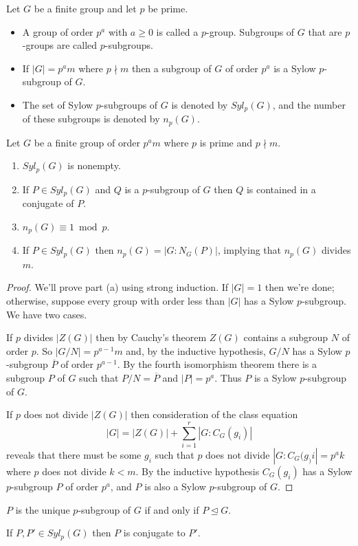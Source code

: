 \documentclass[../m171main.tex]{subfiles}
\begin{document}
\begin{definition}[$p$-group]
    Let $G$ be a finite group and let $p$ be prime.
    \begin{itemize}[topsep=0pt]
        \item A group of order $p^{a}$ with $a \geq 0$ is called a $p$-group.
        Subgroups of $G$ that are $p$-groups are called $p$-subgroups.

        \item If $|G| = p^{a} m$ where $p \nmid m$ then a subgroup of $G$ of order $p^{a}$ is a Sylow $p$-subgroup of $G$.
        
        \item The set of Sylow $p$-subgroups of $G$ is denoted by $Syl_p(G)$, and the number of these subgroups is denoted by $n_p(G)$.
    \end{itemize}
\end{definition}

\begin{theorem}
    Let $G$ be a finite group of order $p^{a}m$ where $p$ is prime and $p \nmid m$.
    \begin{enumerate}[label=(\alph*),topsep=0pt]
        \item $Syl_p(G)$ is nonempty.
        \item If $P \in Syl_p(G)$ and $Q$ is a $p$-subgroup of $G$ then $Q$ is contained in a conjugate of $P$.
        \item $n_p(G) \equiv 1 \bmod p$.
        \item If $P \in Syl_p(G)$ then $n_p(G) = |G : N_G(P)|$, implying that $n_p(G)$ divides $m$.
    \end{enumerate}
\end{theorem}

\begin{proof}
    We'll prove part (a) using strong induction.
    If $|G| = 1$ then we're done; otherwise, suppose every group with order less than $|G|$ has a Sylow $p$-subgroup.
    We have two cases.

    If $p$ divides $|Z(G)|$ then by Cauchy's theorem $Z(G)$ contains a subgroup $N$ of order $p$.
    So $|G / N| = p^{a-1} m$ and, by the inductive hypothesis, $G / N$ has a Sylow $p$-subgroup $\overline P$ of order $p^{a-1}$.
    By the fourth isomorphism theorem there is a subgroup $P$ of $G$ such that $P / N = \overline P$ and $|P| = p^{a}$.
    Thus $P$ is a Sylow $p$-subgroup of $G$.

    If $p$ does not divide $|Z(G)|$ then consideration of the class equation
    \[ |G| = |Z(G)| + \sum_{i=1}^{r} |G : C_G(g_i)| \]
    reveals that there must be some $g_i$ such that $p$ does not divide $|G : C_G(g_)i| = p^{a} k$ where $p$ does not divide $k < m$.
    By the inductive hypothesis $C_G(g_i)$ has a Sylow $p$-subgroup $P$ of order $p^{a}$, and $P$ is also a Sylow $p$-subgroup of $G$.
\end{proof}

\begin{corollary}[]
    $P$ is the unique $p$-subgroup of $G$ if and only if $P \trianglelefteq G$.
\end{corollary}

\begin{corollary}[]
    If $P,P' \in Syl_p(G)$ then $P$ is conjugate to $P'$.
\end{corollary}
\end{document}
